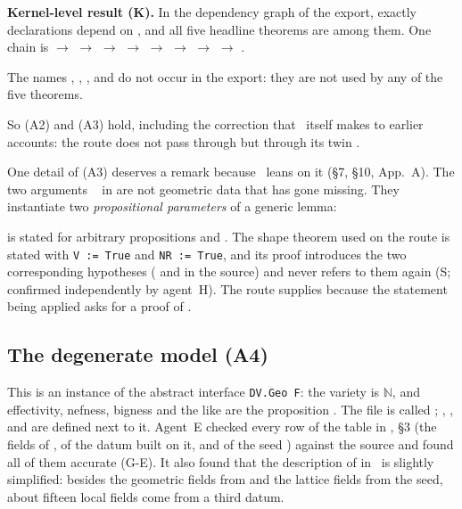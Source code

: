 \begin{verdictbox}
\textbf{Kernel-level result (K).} In the dependency graph of the export, exactly \textbf{\NanyGeo} declarations depend on , and all five headline theorems are among them.
One chain is
{\small{} $\to$  $\to$  $\to$  $\to$ 
$\to$  $\to$ 
$\to$  $\to$ .}

The names , , ,  and  do not occur in the export: they are not used by any of the five theorems.
\end{verdictbox}

So (A2) and (A3) hold, including the correction that \N\ itself makes to earlier accounts: the route does not pass through  but through its twin .

One detail of (A3) deserves a remark because \N\ leans on it (\S7, \S10, App.~A). The two arguments \  in  are not geometric data that has gone missing.
They instantiate two \emph{propositional parameters} of a generic lemma:


 is stated for arbitrary propositions  and . The shape theorem used on the route is stated with \texttt{V := True} and \texttt{NR := True},
and its proof introduces the two corresponding hypotheses ( and  in the source) and never refers to them again (\textsf{S}; confirmed independently by agent~H).
The route supplies  because the statement being applied asks for a proof of .

\subsection{The degenerate model (A4)}
\label{sec:degenerate}


This is an instance of the abstract interface \texttt{DV.Geo F}: the variety is $\mathbb{N}$, and effectivity, nefness, bigness and the like are the proposition .
The file is called ; , ,  and  are defined next to it.
Agent~E checked every row of the table in \N, \S3 (the fields of , of the datum  built on it, and of the seed ) against the source and found all of them accurate (\textsf{G-E}).
It also found that the description of  in \N\ is slightly simplified: besides the geometric fields from  and the lattice fields from the seed, about fifteen local fields come from a third datum.

